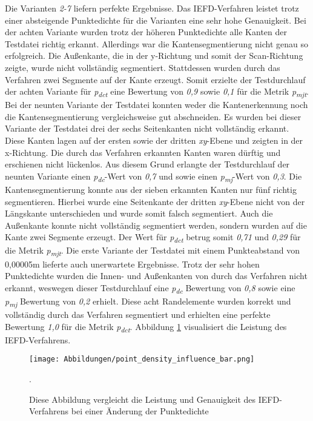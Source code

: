 Die Varianten \textit{2-7} liefern perfekte Ergebnisse. Das IEFD-Verfahren leistet trotz einer absteigende Punktedichte für die Varianten eine sehr hohe Genauigkeit. Bei der achten Variante wurden trotz der höheren Punktedichte alle Kanten der Testdatei richtig erkannt. Allerdings war die Kantensegmentierung nicht genau so erfolgreich. Die Außenkante, die in der y-Richtung und somit der Scan-Richtung zeigte, wurde nicht vollständig segmentiert. Stattdessen wurden durch das Verfahren zwei Segmente auf der Kante erzeugt. Somit erzielte der Testdurchlauf der achten Variante für \textit{p\textsubscript{dct}} eine Bewertung von \textit{0,9} sowie \textit{0,1} für die Metrik \textit{p\textsubscript{mjt}}. Bei der neunten Variante der Testdatei konnten weder die Kantenerkennung noch die Kantensegmentierung vergleichsweise gut abschneiden. Es wurden bei dieser Variante der Testdatei drei der sechs Seitenkanten nicht vollständig erkannt. Diese Kanten lagen auf der ersten sowie der dritten \textit{xy}-Ebene und zeigten in der x-Richtung. Die durch das Verfahren erkannten Kanten waren dürftig und erschienen nicht lückenlos. Aus diesem Grund erlangte der Testdurchlauf der neunten Variante einen \textit{p\textsubscript{dc}}-Wert von \textit{0,7} und sowie einen \textit{p\textsubscript{mj}}-Wert von \textit{0,3}. Die Kantensegmentierung konnte aus der sieben erkannten Kanten nur fünf richtig segmentieren. Hierbei wurde eine Seitenkante der dritten \textit{xy}-Ebene nicht von der Längskante unterschieden und wurde somit falsch segmentiert. Auch die Außenkante konnte nicht vollständig segmentiert werden, sondern wurden auf die Kante zwei Segmente erzeugt. Der Wert für \textit{p\textsubscript{dct}} betrug somit \textit{0,71} und \textit{0,29} für die Metrik \textit{p\textsubscript{mjt}}. Die erste Variante der Testdatei mit einem Punkteabstand von 0,00005m lieferte auch unerwartete Ergebnisse. Trotz der sehr hohen Punktedichte wurden die Innen- und Außenkanten von \testcloud durch das Verfahren nicht erkannt, weswegen dieser Testdurchlauf eine \textit{p\textsubscript{dc}} Bewertung von \textit{0,8} sowie eine \textit{p\textsubscript{mj}} Bewertung von \textit{0,2} erhielt. Diese acht Randelemente wurden korrekt und vollständig durch das Verfahren segmentiert und erhielten eine perfekte Bewertung \textit{1,0} für die Metrik \textit{p\textsubscript{dct}}. Abbildung \ref{fig: point_density_bar_chart} visualisiert die Leistung des IEFD-Verfahrens.

\begin{figure}[t]
	\texttt{[image: Abbildungen/point\_density\_influence\_bar.png]}
	\centering
	\caption{Diese Abbildung vergleicht die Leistung und Genauigkeit des IEFD-Verfahrens bei einer Änderung der Punktedichte}.
	\label{fig: point_density_bar_chart}
\end{figure}


